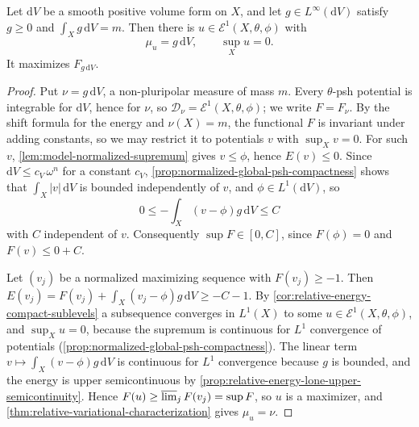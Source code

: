 \begin{theorem}\label{thm:bounded-density-relative-prescribed-measure}
Let $\mathrm dV$ be a smooth positive volume form on $X$, and let $g\in L^\infty(\mathrm dV)$ satisfy $g\geq0$ and $\int_Xg\,\mathrm dV=m$. Then there is $u\in\mathcal E^1(X,\theta,\phi)$ with
\[
 \mu_u=g\,\mathrm dV,\qquad \sup_Xu=0.
\]
It maximizes $F_{g\,\mathrm dV}$.
\end{theorem}
\begin{proof}
Put $\nu=g\,\mathrm dV$, a non-pluripolar measure of mass $m$. Every $\theta$-psh potential is integrable for $\mathrm dV$, hence for $\nu$, so $\mathcal D_\nu=\mathcal E^1(X,\theta,\phi)$; we write $F=F_\nu$. By the shift formula for the energy and $\nu(X)=m$, the functional $F$ is invariant under adding constants, so we may restrict it to potentials $v$ with $\sup_Xv=0$. For such $v$, \cref{lem:model-normalized-supremum} gives $v\leq\phi$, hence $E(v)\leq0$. Since $\mathrm dV\leq c_V\,\omega^n$ for a constant $c_V$, \cref{prop:normalized-global-psh-compactness} shows that $\int_X|v|\,\mathrm dV$ is bounded independently of $v$, and $\phi\in L^1(\mathrm dV)$, so
\[
 0\leq-\int_X(v-\phi)g\,\mathrm dV\leq C
\]
with $C$ independent of $v$. Consequently $\sup F\in[0,C]$, since $F(\phi)=0$ and $F(v)\leq0+C$.

Let $(v_j)$ be a normalized maximizing sequence with $F(v_j)\geq-1$. Then $E(v_j)=F(v_j)+\int_X(v_j-\phi)g\,\mathrm dV\geq-C-1$. By \cref{cor:relative-energy-compact-sublevels} a subsequence converges in $L^1(X)$ to some $u\in\mathcal E^1(X,\theta,\phi)$, and $\sup_Xu=0$, because the supremum is continuous for $L^1$ convergence of potentials (\cref{prop:normalized-global-psh-compactness}). The linear term $v\mapsto\int_X(v-\phi)g\,\mathrm dV$ is continuous for $L^1$ convergence because $g$ is bounded, and the energy is upper semicontinuous by \cref{prop:relative-energy-lone-upper-semicontinuity}. Hence $F(u)\geq\varlimsup_jF(v_j)=\sup F$, so $u$ is a maximizer, and \cref{thm:relative-variational-characterization} gives $\mu_u=\nu$.
\end{proof}

